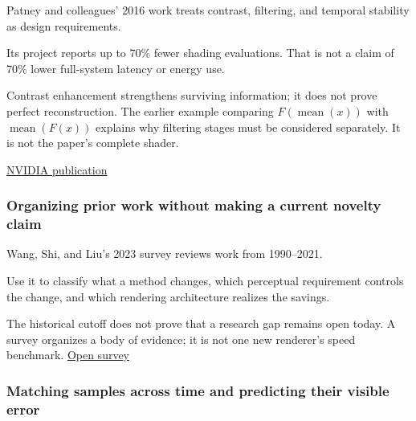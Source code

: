 \hypertarget{04-visual-computing-ii-ch043-keeping-resolvable-contrast-rather-than-merely-blurring-the-periphery}{}

Patney and colleagues' 2016 work treats contrast, filtering, and temporal stability as design requirements.

Its project reports up to 70\% fewer shading evaluations. That is not a claim of 70\% lower full-system latency or energy use.

Contrast enhancement strengthens surviving information; it does not prove perfect reconstruction. The earlier example comparing \(F(\operatorname{mean}(x))\) with \(\operatorname{mean}(F(x))\) explains why filtering stages must be considered separately. It is not the paper's complete shader.

\href{https://research.nvidia.com/publication/2016-12_towards-foveated-rendering-gaze-tracked-virtual-reality}{NVIDIA publication}

\subsubsection{Organizing prior work without making a current novelty claim}\label{04-visual-computing-ii-ch043-organizing-prior-work-without-making-a-current-novelty-claim}

\hypertarget{04-visual-computing-ii-ch043-organizing-prior-work-without-making-a-current-novelty-claim}{}

Wang, Shi, and Liu's 2023 survey reviews work from 1990--2021.

Use it to classify what a method changes, which perceptual requirement controls the change, and which rendering architecture realizes the savings.

The historical cutoff does not prove that a research gap remains open today. A survey organizes a body of evidence; it is not one new renderer's speed benchmark. \href{https://link.springer.com/article/10.1007/s41095-022-0306-4}{Open survey}

\subsubsection{Matching samples across time and predicting their visible error}\label{04-visual-computing-ii-ch043-matching-samples-across-time-and-predicting-their-visible-error}

\hypertarget{04-visual-computing-ii-ch043-matching-samples-across-time-and-predicting-their-visible-error}{}

